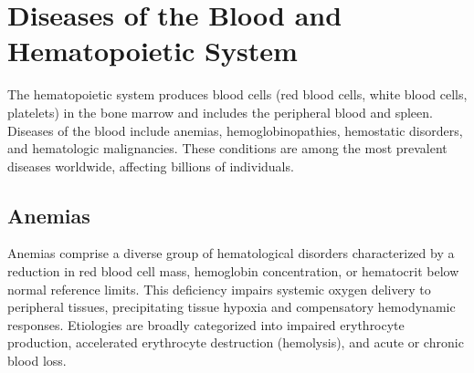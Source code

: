 \chapter{Diseases of the Blood and Hematopoietic System}
\label{ch:blood}
The hematopoietic system produces blood cells (red blood cells, white blood cells, platelets) in the bone marrow and includes the peripheral blood and spleen. Diseases of the blood include anemias, hemoglobinopathies, hemostatic disorders, and hematologic malignancies. These conditions are among the most prevalent diseases worldwide, affecting billions of individuals.

\section{Anemias}




Anemias comprise a diverse group of hematological disorders characterized by a reduction in red blood cell mass, hemoglobin concentration, or hematocrit below normal reference limits. This deficiency impairs systemic oxygen delivery to peripheral tissues, precipitating tissue hypoxia and compensatory hemodynamic responses. Etiologies are broadly categorized into impaired erythrocyte production, accelerated erythrocyte destruction (hemolysis), and acute or chronic blood loss.





\label{sec:Anemias}

